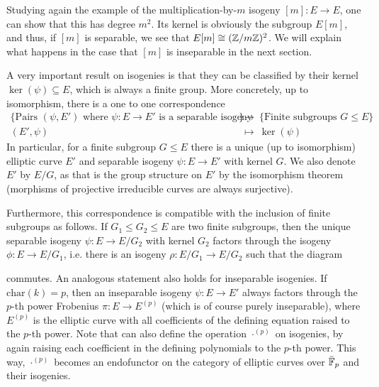 Studying again the example of the multiplication-by-$m$ isogeny $[m]: E \to E$, one can show that this has degree $m^2$.
Its kernel is obviously the subgroup $E[m]$, and thus, if $[m]$ is separable, we see that $E[m] \cong (\mathbb{Z}/m\mathbb{Z})^2$.
We will explain what happens in the case that $[m]$ is inseparable in the next section.

A very important result on isogenies is that they can be classified by their kernel $\ker(\psi) \subseteq E$, which is always a finite group.
More concretely, up to isomorphism, there is a one to one correspondence
\begin{align*}
    \{ \text{Pairs $(\psi, E')$ where $\psi: E \to E'$ is a separable isogeny} \}  \ &\to \ \{ \text{Finite subgroups $G \leq E$} \} \\
    (E', \psi) \ &\mapsto \ \ker(\psi)
\end{align*}
In particular, for a finite subgroup $G \leq E$ there is a unique (up to isomorphism) elliptic curve $E'$ and separable isogeny $\psi: E \to E'$ with kernel $G$.
We also denote $E'$ by $E/G$, as that is the group structure on $E'$ by the isomorphism theorem (morphisms of projective irreducible curves are always surjective).

Furthermore, this correspondence is compatible with the inclusion of finite subgroups as follows.
If $G_1 \leq G_2 \leq E$ are two finite subgroups, then the unique separable isogeny $\psi: E \to E/G_2$ with kernel $G_2$ factors through the isogeny $\phi: E \to E/G_1$, i.e. there is an isogeny $\rho: E/G_1 \to E/G_2$ such that the diagram
\begin{center}
\end{center}
commutes.
An analogous statement also holds for inseparable isogenies.
If $\mathrm{char}(k) = p$, then an inseparable isogeny $\psi: E \to E'$ always factors through the $p$-th power Frobenius $\pi: E \to E^{(p)}$ (which is of course purely inseparable), where $E^{(p)}$ is the elliptic curve with all coefficients of the defining equation raised to the $p$-th power.
Note that can also define the operation $\cdot^{(p)}$ on isogenies, by again raising each coefficient in the defining polynomials to the $p$-th power.
This way, $\cdot^{(p)}$ becomes an endofunctor on the category of elliptic curves over $\bar{\mathbb{F}}_p$ and their isogenies.

